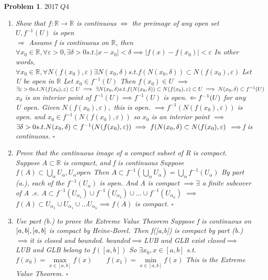 \documentclass[a4paper]{article}
\newtheorem{prob}{\large{\large{Problem}}}
\newenvironment{sol}{\noindent{\large{\bf Solution:}}}{\hfill\ensuremath{\square}}
\def\bR{\mathbb R}
\def\imp{\ensuremath{\implies}}
\def\nl{\newline}
\begin{document}
\begin{prob} %
\large{$2017\; Q4$
\begin{enumerate}[(a.)]
\item Show that $f:\bR\to\bR$ is continuous $\iff$ the preimage of any open set  $U, f^{-1}(U)$ is open
\nl \begin{sol}
\large{ \\$\Rightarrow$
\nl Assume f is continuous on $\bR$, then 
\nl $\forall x_0\in \bR, \forall\varepsilon>0, \exists \delta>0 s.t. |x-x_0|<\delta \imp |f(x)-f(x_0)|<\varepsilon$
\nl In other words, $\forall x_0 \in \bR, \forall N(f(x_0),\varepsilon) \exists N(x_0,\delta)s.t. f(N(x_0,\delta))\subset N(f(x_0),\varepsilon)$
\nl Let U be open in $\bR$
\nl Let $x_0\in f^{-1}(U)$
\nl Then $f(x_0)\in U$
\nl\imp $\exists \varepsilon>0 s.t. N(f(x_0),\varepsilon)\subset U
\nl\imp \exists N(x_0,\delta) s.t. f(N(x_0,\delta))\subset N(f(x_0),\varepsilon)\subset U
\nl\imp N(x_0,\delta)\subset f^{-1}(U)$
\nl $x_0$ is an interior point of $f^{-1}(U)\imp f^{-1}(U)$ is open. 
\nl $\Leftarrow 
\nl f^{-1}(U)$ for any U open.
\nl Given $N(f(x_0),\varepsilon),$ this is open.
\imp $f^{-1}(N(f(x_0),\varepsilon))$ is open.
\nl and $x_0 \in f^{-1}(N(f(x_0),\varepsilon))$ so $x_0$ is an interior point
\nl\imp $\exists \delta>0 s.t. N(x_0,\delta)\subset f^{-1}(N(f(x_0),\varepsilon))
\nl\imp f(N(x_0,\delta)\subset N(f(x_0),\varepsilon)$ \imp f is continuous.
}
\end{sol}
\item Prove that the continuous image of a compact subset of R is compact.
\nl \begin{sol}
\large{ Suppose $A\subset \bR$ is compact, and f is continuous
\nl Suppose $f(A)\subset\bigcup\limits_\alpha U_\alpha, U_\alpha open$
\nl Then $A\subset f^{-1}(\bigcup\limits_\alpha U_\alpha)=\bigcup\limits_\alpha f^{-1}(U_\alpha)$
\nl By part (a.), each of the $f^{-1}(U_\alpha)$ is open.
\nl And A is compact $\imp \exists$ a finite subcover of A
\nl .e. $A\subset f^{-1}(U_{\alpha_1})\cup f^{-1}( U_{\alpha_2})\cup\dots\cup f^{-1}( U_{\alpha_n})$
\nl \imp $f(A)\subset U_{\alpha_1}\cup U_{\alpha_1}\cup \dots U_{\alpha_n} \imp f(A)$ is compact.
}
\end{sol}
\item Use part (b.) to prove the Extreme Value Theorem
\nl\begin{sol}
\nl \large{ Suppose f is continuous on $[a,b], \nl [a,b]$ is compact by Heine-Borel.
\nl Then f([a,b]) is compact by part (b.)\imp it is closed and bounded.
\nl\quad bounded\imp LUB and GLB exist
\nl\quad closed\imp LUB and GLB belong to $f([a,b])$
\nl So $\exists x_0,x\in[a,b]$ s.t. $f(x_0)=\max\limits_{x\in[a,b]}f(x)\qquad f(x_1)=\min\limits_{x\in[a,b]}f(x)$
\nl This is the Extreme Value Theorem.
}
\end{sol}
\end{enumerate}
}

\end{prob}
\end{document}
